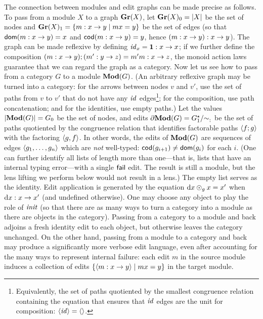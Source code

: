 The connection between modules and edit graphs can be made precise as
follows. To pass from a module $X$ to a graph $\mathbf{Gr}(X)$, let $\mathbf{Gr}(X)_0=|X|$
be the set of nodes and $\mathbf{Gr}(X)_1=\{m : x \to y \mid mx=y\}$ be the set
of edges (so that $\mathsf{dom}(m : x \to y)=x$ and $\mathsf{cod}(m : x \to y)=y$,
hence $(m : x \to y) : x \to y$). The graph can be made reflexive by
defining $\mathit{id}_x = \mbox{\bf{1}} : x \to x$; if we further define the composition
$(m : x \to y);(m' : y \to z)=m'm : x \to z$, the monoid action
laws guarantee that we can regard the graph as a category. Now let us see
how to pass from a category $G$ to a module $\mathbf{Mod}(G)$. (An arbitrary
reflexive graph may be turned into a category: for the arrows between nodes
$v$ and $v'$, use the set of paths from $v$ to $v'$ that do not have any
$\mathit{id}$ edges\footnote{Equivalently, the set of paths quotiented by the
smallest congruence relation containing the equation that ensures that $\mathit{id}$
edges are the unit for composition: $\left< \mathit{id} \right> = \left<\right>$.}; for the
composition, use path concatenation; and for the identities, use empty
paths.) Let the values $|\mathbf{Mod}(G)|=G_0$ be the set of nodes, and edits $\partial
\mathbf{Mod}(G)=G_1^\star/{\sim}_;$ be the set of paths quotiented by the congruence
relation that identifies factorable paths $\left< f;g \right>$ with the
factoring $\left< g , f \right>$. In other words, the edits of $\mathbf{Mod}(G)$
are sequences of edges $\left< g_1 ,\ldots, g_n \right>$ which are \emph{not}
well-typed: $\mathsf{cod}(g_{i+1}) \ne \mathsf{dom}(g_i)$ for each $i$. (One can further
identify all lists of length more than one---that is, lists that have an
internal typing error---with a single $\mathsf{fail}$ edit. The result is still a
module, but the lens lifting we perform below would not result in a lens.)
The empty list serves as the identity. Edit application is generated by the
equation $\textrm{d} x \odot_g x = x'$ when $\textrm{d} x : x \to x'$ (and undefined
otherwise). One may choose any object to play the role of $\mathit{init}$ (so that
there are as many ways to turn a category into a module as there are objects
in the category). Passing from a category to a module and back adjoins a
fresh identity edit to each object, but otherwise leaves the category
unchanged. On the other hand, passing from a module to a category and back
may produce a significantly more verbose edit language, even after
accounting for the many ways to represent internal failure: each edit $m$ in
the source module induces a collection of edits $\{\left< m : x \to
y\right> \mid mx = y\}$ in the target module.

